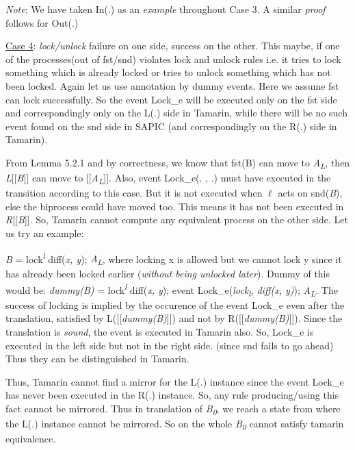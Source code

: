 \documentclass[11pt]{article}
\begin{document}
{\it Note}: We have taken In(.) as an {\it example} throughout Case 3. A similar {\it proof} follows for Out(.)\newline

\underline{Case 4}: {\it lock/unlock} failure on one side, success on the other. This maybe, if one of the processes(out of fst/snd) violates lock and unlock rules i.e. it tries to lock something which is already locked or tries to unlock something which has not been locked. Again let us use annotation by dummy events. Here we assume fst can lock successfully. So the event Lock\_e will be executed only on the fst side and correspondingly only on the L(.) side in Tamarin, while there will be no such event found on the snd side in SAPIC (and correspondingly on the R(.) side in Tamarin).

From Lemma 5.2.1 and by correctness, we know that fst(B) can move to {\it A\textsubscript{L}}, then {\it L}[[{\it B}]] can move to [[{\it A\textsubscript{L}}]]. Also, event Lock\_e(. , .) must have executed in the transition according to this case. But it is not executed when $\ell$ acts on snd({\it B}), else the biprocess could have moved too. This means it has not been executed in {\it R}[[{\it B}]]. So, Tamarin cannot compute any equivalent process on the other side. Let us try an example:

{\it B} = lock\textsuperscript{{\it l}} diff({\it x, y}); {\it A\textsubscript{L}}, where locking x is allowed but we cannot lock y since it has already been locked earlier ({\it without being unlocked later}). Dummy of this would be: {\it dummy(B)} = lock\textsuperscript{{\it l}} diff({\it x, y}); event Lock\_e({\it lock\textsubscript{l}, diff({\it x, y})}); {\it A\textsubscript{L}}. The success of locking is implied by the occurence of the event Lock\_e even after the translation, satisfied by L([[{\it dummy(B)}]]) and not by R([[{\it dummy(B)}]]). Since the translation is {\it sound}, the event is executed in Tamarin also. So, Lock\_e is executed in the left side but not in the right side. (since snd fails to go ahead) Thus they can be distinguished in Tamarin. 

Thus, Tamarin cannot find a mirror for the L(.) instance since the event Lock\_e has never been executed in the R(.) instance. So, any rule producing/using this fact cannot be mirrored. Thus in translation of {\it B\textsubscript{0}}, we reach a state from where the L(.) instance cannot be mirrored. So on the whole {\it B\textsubscript{0}} cannot satisfy tamarin equivalence.\newline
\end{document}
